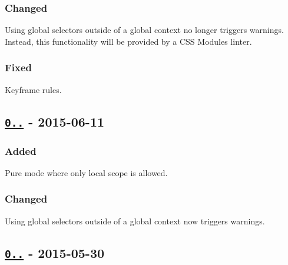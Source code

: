 \subsubsection*{Changed}


\begin{DoxyItemize}
\item Using global selectors outside of a global context no longer triggers warnings. Instead, this functionality will be provided by a C\+SS Modules linter.
\end{DoxyItemize}

\subsubsection*{Fixed}


\begin{DoxyItemize}
\item Keyframe rules.
\end{DoxyItemize}

\subsection*{\href{https://github.com/postcss-modules-local-by-default/compare/v0.0.7...v0.0.8}{\tt 0..} -\/ 2015-\/06-\/11}

\subsubsection*{Added}


\begin{DoxyItemize}
\item Pure mode where only local scope is allowed.
\end{DoxyItemize}

\subsubsection*{Changed}


\begin{DoxyItemize}
\item Using global selectors outside of a global context now triggers warnings.
\end{DoxyItemize}

\subsection*{\href{https://github.com/postcss-modules-local-by-default/compare/v0.0.6...v0.0.7}{\tt 0..} -\/ 2015-\/05-\/30}

